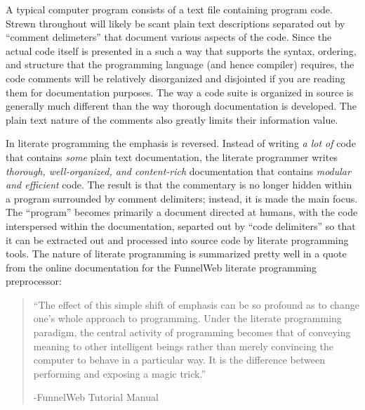 A typical computer program consists of a text file 
containing program code. Strewn throughout will likely be scant plain text descriptions separated out by 
``comment delimeters'' that document various aspects of the code.
Since the actual code itself is presented in a such a way that supports the syntax, ordering, and structure 
that the programming language (and hence compiler) requires, the code comments will
be relatively disorganized and disjointed if you are reading them for documentation purposes. 
The way a code suite is organized in source is generally much different than the way thorough documentation is 
developed. The plain text nature of the comments also greatly limits their information value.

In literate programming the emphasis is reversed. Instead of writing \textit{a lot of} code that contains 
\textit{some} plain text documentation, 
the literate programmer writes \textit{thorough, well-organized, and content-rich} documentation that contains 
\textit{modular and efficient} code. 
The result is that the commentary is no longer hidden within a program surrounded by 
comment delimiters; instead, it is made the main focus. 
The ``program'' becomes primarily a document directed at humans, with the 
code interspersed within the documentation, separted out by ``code delimiters'' so that it can be extracted 
out and processed into source code by literate programming tools. The nature of literate programming is 
summarized pretty well in a quote from the online documentation for the FunnelWeb literate programming
preprocessor:

\begin{quote}
``The effect of this simple shift of emphasis can be so profound as to change one's whole approach to
programming. Under the literate programming paradigm, the central activity of programming becomes that of 
conveying meaning to other intelligent beings rather than merely convincing the computer to behave in a 
particular way. It is the difference between performing and exposing a magic trick.'' 
\begin{flushright}
-FunnelWeb Tutorial Manual\cite{funnelweb-what-is-literate-programming}
\end{flushright}
\end{quote}

